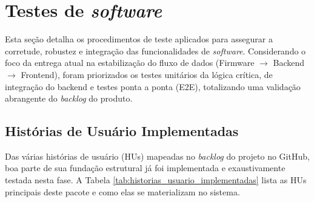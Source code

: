 \section{Testes de \textit{software}}
\label{testes-software}

Esta seção detalha os procedimentos de teste aplicados para assegurar a corretude, robustez e integração das funcionalidades de \textit{software}. Considerando o foco da entrega atual na estabilização do fluxo de dados (Firmware $\rightarrow$ Backend $\rightarrow$ Frontend), foram priorizados os testes unitários da lógica crítica, de integração do backend e testes ponta a ponta (E2E), totalizando uma validação abrangente do \textit{backlog} do produto.

\subsection{Histórias de Usuário Implementadas}

Das várias histórias de usuário (HUs) mapeadas no \textit{backlog} do projeto no GitHub, boa parte de sua fundação estrutural já foi implementada e exaustivamente testada nesta fase. A Tabela \ref{tab:historias_usuario_implementadas} lista as HUs principais deste pacote e como elas se materializam no sistema.


